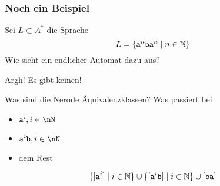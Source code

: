\begin{frame}
	\frametitle{Noch ein Beispiel}
	Sei $L \subset A^\ast$ die Sprache 
	$$L = \{ \mathtt a^n \mathtt b \mathtt a^n \mid n \in \mathbb{N}\}$$ Wie sieht ein endlicher Automat dazu aus? \pause
	\begin{minipage}{0.49\linewidth}\vspace*{8em}
		\centering \vfill
		Argh! Es gibt keinen! \vspace*{4em}
	\end{minipage}\pause
	\begin{minipage}{0.49\linewidth}
		Was sind die Nerode Äquivalenz\-klassen? \pause
		Was passiert bei
		\begin{itemize}[<+->]
			\item $\mathtt a^i, i \in \nN$
			\item $\mathtt a^i \mathtt b, i \in \nN$
			\item dem Rest
		\end{itemize} \pause
		$$\{[\mathtt a^i] \mid i \in \mathbb{N}\} \cup \{[\mathtt a^i \mathtt b] \mid i \in \mathbb{N}\} \cup [\mathtt{ba}]$$
		
	\end{minipage}
\end{frame}


